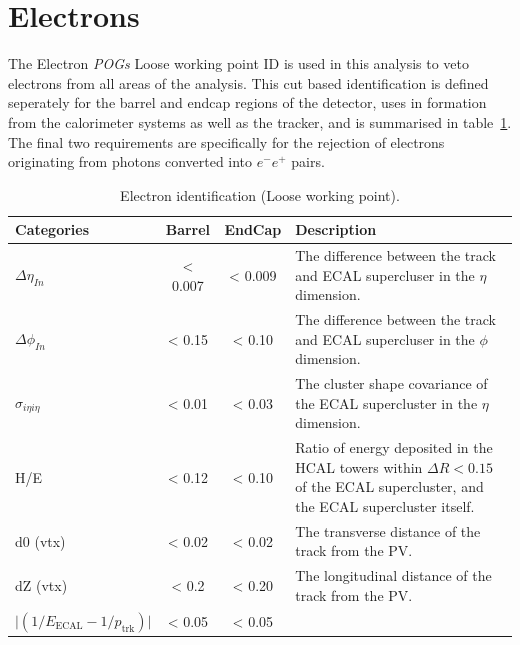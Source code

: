 \section{Electrons}  %
\label{sec:objects_electrons}
The Electron \emph{POGs} Loose working point ID \cite{ref:electronidtwiki} is
used in this analysis to veto 
electrons from all areas of the analysis. This cut based identification is 
defined seperately for the barrel and endcap regions of the detector, uses in
formation from the calorimeter systems as well as the tracker, and is
summarised in table~\ref{tab:ele-id}. The final two requirements are
specifically for the rejection of electrons originating from photons converted
into $e^-e^+$ pairs.

\begin{table}[ht!]
  \caption{Electron identification (Loose working point).\label{tab:ele-id}}
  \centering
  \scriptsize
  \begin{tabular}{ lccp{8cm} }
    \hline
    \hline
    Categories                                               & Barrel    & EndCap    & 
    Description \\
    \hline
    $\Delta \eta_{In}$                                       & < 0.007     &
    < 0.009     & 
    The difference between the track and ECAL supercluser in the $\eta$ dimension. \\
    $\Delta \phi_{In}$                                       & < 0.15      &
    < 0.10      &
    The difference between the track and ECAL supercluser in the $\phi$ dimension. \\
    $\sigma_{i\eta i\eta}$                                   & < 0.01      &
    < 0.03      & 
    The cluster shape covariance of the ECAL supercluster in the $\eta$ dimension. \\
    H/E                                                      & < 0.12      & < 0.10      &
    Ratio of energy deposited in the HCAL towers within $\Delta R<0.15$ of the ECAL 
    supercluster, and the ECAL supercluster itself. \\
    d0 (vtx)                                                 & < 0.02      & < 0.02      &
    The transverse distance of the track from the PV. \\
    dZ (vtx)                                                 & < 0.2       & < 0.20      &
    The longitudinal distance of the track from the PV. \\
    $\lvert(1/E_{\textrm{ECAL}} - 1/p_{\textrm{trk}})\rvert$ & < 0.05      & < 0.05      &

\end{tabular}
\end{table}
